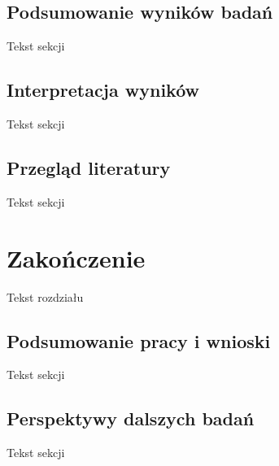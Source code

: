 \documentclass[licencjacka]{pracamgr_Kogni}
\begin{document}
\section{Podsumowanie wyników badań}
Tekst sekcji
\section{Interpretacja wyników}
Tekst sekcji
\section{Przegląd literatury}
Tekst sekcji

\chapter{Zakończenie}
Tekst rozdziału
\section{Podsumowanie pracy i wnioski}
Tekst sekcji
\section{Perspektywy dalszych badań}
Tekst sekcji
\end{document}
